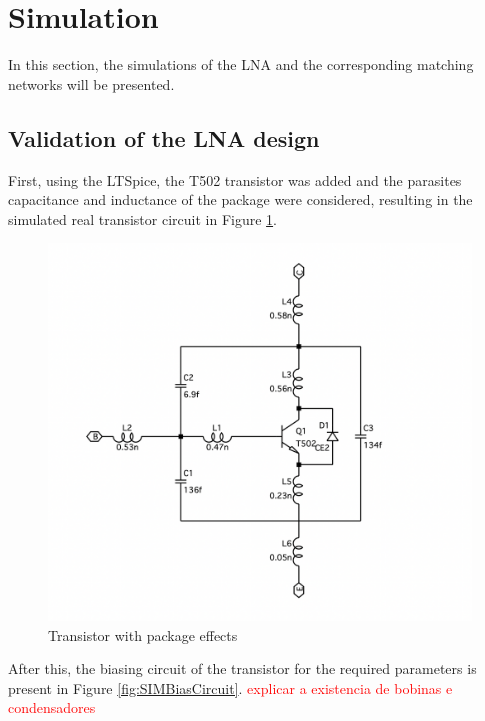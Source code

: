 \section{Simulation}

In this section, the simulations of the LNA and the corresponding matching networks will be presented.

\subsection{Validation of the LNA design}

First, using the LTSpice, the T502 transistor was added and the parasites capacitance and inductance of the package were considered, resulting in the simulated real transistor circuit in Figure \ref{fig:TransistorReal}.

\begin{figure}[H]
    \centering
    \includegraphics*[scale = 0.3]{Images/TransistorReal.png}
    \caption{Transistor with package effects}
    \label{fig:TransistorReal}
\end{figure}

After this, the biasing circuit of the transistor for the required  parameters is present in Figure \ref{fig:SIMBiasCircuit}.
\textcolor{red}{explicar a existencia de bobinas e condensadores}

